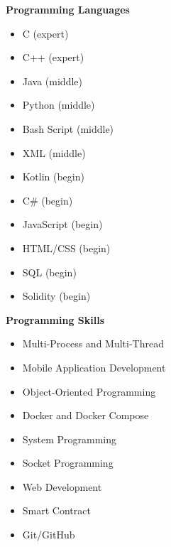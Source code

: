 \documentclass[a4paper,11pt]{article}
\begin{document}
\noindent
\begin{minipage}[t]{0.48\textwidth}
    \textbf{Programming Languages}
    \vspace{0.3em}
    \begin{itemize}[leftmargin=2em]
        \item C (expert)
        \item C++ (expert)
        \item Java (middle)
        \item Python (middle)
        \item Bash Script (middle)
        \item XML (middle)
        \item Kotlin (begin)
        \item C\# (begin)
		\item JavaScript (begin)
        \item HTML/CSS (begin)
        \item SQL (begin)
        \item Solidity (begin)
    \end{itemize}
\end{minipage}%
\hfill
\begin{minipage}[t]{0.48\textwidth}
    \textbf{Programming Skills}
    \vspace{0.3em}
    \begin{itemize}[leftmargin=2em]
        \item Multi-Process and Multi-Thread
        \item Mobile Application Development
        \item Object-Oriented Programming
        \item Docker and Docker Compose
        \item System Programming
        \item Socket Programming
        \item Web Development
        \item Smart Contract
        \item Git/GitHub
    \end{itemize}
\end{minipage}
\end{document}
